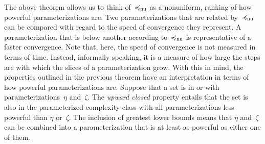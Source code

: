The above theorem allows us to think of~$\preccurlyeq_\mathrm{nu}$ as a nonuniform, ranking of how powerful parameterizations are.
Two parameterizations that are related by~$\preccurlyeq_\mathrm{nu}$ can be compared with regard to the speed of convergence they represent.
A parameterization that is below another according to~$\preccurlyeq_\mathrm{nu}$ is representative of a faster convergence.
Note that, here, the speed of convergence is not measured in terms of time.
Instead, informally speaking, it is a measure of how large the steps are with which the slices of a parameterization grow.
With this in mind, the properties outlined in the previous theorem have an interpretation in terms of how powerful parameterizations are.
Suppose that a set is in  or  with parameterizations~$\eta$ and~$\zeta$.
The \emph{upward closed} property entails that the set is also in the parameterized complexity class with all parameterizations less powerful than $\eta$ or~$\zeta$.
The inclusion of greatest lower bounds means that $\eta$ and~$\zeta$ can be combined into a parameterization that is at least as powerful as either one of them.

